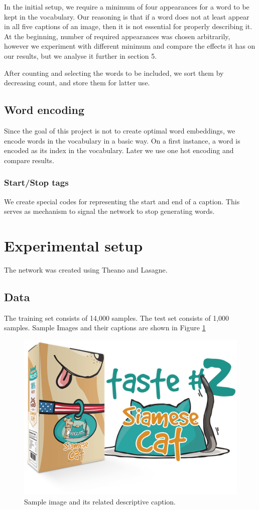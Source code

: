 \documentclass{article}
\begin{document}
In the initial setup, we require a minimum of four appearances for a word to be kept in the vocabulary. Our reasoning is that if a word does not at least appear in all five captions of an image, then it is not essential for properly describing it. At the beginning, number of required appearances was chosen arbitrarily, however we experiment with different minimum and compare the effects it has on our results, but we analyse it further in section 5.

After counting and selecting the words to be included, we sort them by decreasing count, and store them for latter use.

\subsection{Word encoding}
Since the goal of this project is not to create optimal word embeddings, we encode words in the vocabulary in a basic way.
On a first instance, a word is encoded as its index in the vocabulary. Later we use one hot encoding and compare results. 

\subsubsection{Start/Stop tags} 
We create special codes for representing the start and end of a caption. This serves as mechanism to signal the network to stop generating words.

\section{Experimental setup}
The network was created using Theano and Lasagne.

\subsection{Data}
The training set consists of 14,000 samples. The test set consists of 1,000 samples. Sample Images and their captions are shown in Figure \ref{fig:sample_input}

\begin{figure}[H]
  \centering
  \includegraphics[width=.36\linewidth]{./images/sample_input.png}
  \caption{Sample image and its related descriptive caption.}
  \label{fig:sample_input}
\end{figure}
\end{document}
